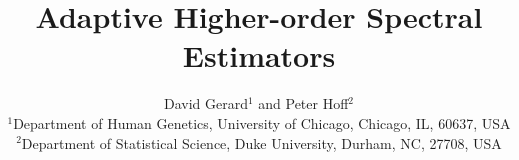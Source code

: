 \documentclass[11pt,authoryear]{article}
\begin{document}
\singlespacing
\title{Adaptive Higher-order Spectral Estimators}
\author{David Gerard$^1$ and Peter Hoff$^{2}$ \\
$^1$Department of Human Genetics, University of Chicago, Chicago, IL, 60637, USA\\
$^2$Department of Statistical Science, Duke University, Durham, NC, 27708, USA}
\maketitle
\let\thefootnote\relax{}









\appendix



\end{document}
